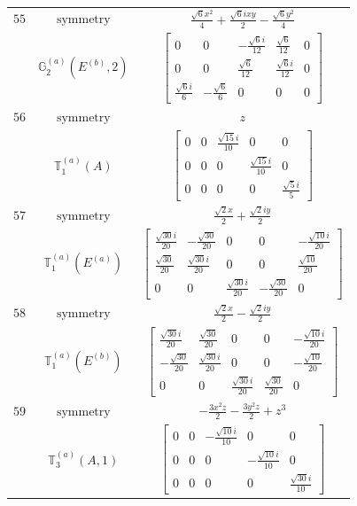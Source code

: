 \documentclass[fleqn,8pt,landscape]{jsarticle}
\begin{document}
\begin{longtable}{ccc}
$ 55 $ & $ \text{symmetry} $ & $ \frac{\sqrt{6} x^{2}}{4} + \frac{\sqrt{6} i x y}{2} - \frac{\sqrt{6} y^{2}}{4} $ \\
$  $ & $ \mathbb{G}_{2}^{(a)}(E^{(b)},2) $ & $ \begin{bmatrix} 0 & 0 & - \frac{\sqrt{6} i}{12} & \frac{\sqrt{6}}{12} & 0 \\ 0 & 0 & \frac{\sqrt{6}}{12} & \frac{\sqrt{6} i}{12} & 0 \\ \frac{\sqrt{6} i}{6} & - \frac{\sqrt{6}}{6} & 0 & 0 & 0 \end{bmatrix} $ \\ \hline
$ 56 $ & $ \text{symmetry} $ & $ z $ \\
$  $ & $ \mathbb{T}_{1}^{(a)}(A) $ & $ \begin{bmatrix} 0 & 0 & \frac{\sqrt{15} i}{10} & 0 & 0 \\ 0 & 0 & 0 & \frac{\sqrt{15} i}{10} & 0 \\ 0 & 0 & 0 & 0 & \frac{\sqrt{5} i}{5} \end{bmatrix} $ \\ \hline
$ 57 $ & $ \text{symmetry} $ & $ \frac{\sqrt{2} x}{2} + \frac{\sqrt{2} i y}{2} $ \\
$  $ & $ \mathbb{T}_{1}^{(a)}(E^{(a)}) $ & $ \begin{bmatrix} \frac{\sqrt{30} i}{20} & - \frac{\sqrt{30}}{20} & 0 & 0 & - \frac{\sqrt{10} i}{20} \\ \frac{\sqrt{30}}{20} & \frac{\sqrt{30} i}{20} & 0 & 0 & \frac{\sqrt{10}}{20} \\ 0 & 0 & \frac{\sqrt{30} i}{20} & - \frac{\sqrt{30}}{20} & 0 \end{bmatrix} $ \\ \hline
$ 58 $ & $ \text{symmetry} $ & $ \frac{\sqrt{2} x}{2} - \frac{\sqrt{2} i y}{2} $ \\
$  $ & $ \mathbb{T}_{1}^{(a)}(E^{(b)}) $ & $ \begin{bmatrix} \frac{\sqrt{30} i}{20} & \frac{\sqrt{30}}{20} & 0 & 0 & - \frac{\sqrt{10} i}{20} \\ - \frac{\sqrt{30}}{20} & \frac{\sqrt{30} i}{20} & 0 & 0 & - \frac{\sqrt{10}}{20} \\ 0 & 0 & \frac{\sqrt{30} i}{20} & \frac{\sqrt{30}}{20} & 0 \end{bmatrix} $ \\ \hline
$ 59 $ & $ \text{symmetry} $ & $ - \frac{3 x^{2} z}{2} - \frac{3 y^{2} z}{2} + z^{3} $ \\
$  $ & $ \mathbb{T}_{3}^{(a)}(A,1) $ & $ \begin{bmatrix} 0 & 0 & - \frac{\sqrt{10} i}{10} & 0 & 0 \\ 0 & 0 & 0 & - \frac{\sqrt{10} i}{10} & 0 \\ 0 & 0 & 0 & 0 & \frac{\sqrt{30} i}{10} \end{bmatrix} $ \\ \hline

\end{longtable}
\end{document}
